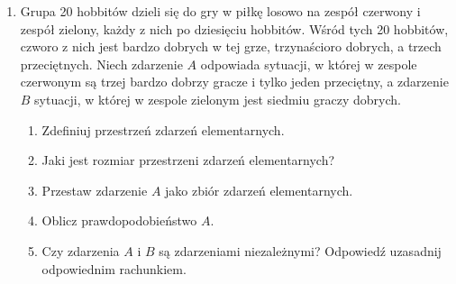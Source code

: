 \documentclass{mwart}
\begin{document}
\begin{enumerate}
\item Grupa 20 hobbitów dzieli się do gry w piłkę losowo na zespół czerwony i zespół zielony, każdy z nich po dziesięciu hobbitów.
Wśród tych 20 hobbitów, czworo z nich jest bardzo dobrych w tej grze, trzynaścioro dobrych, a trzech przeciętnych.
Niech zdarzenie $A$ odpowiada sytuacji, w której w zespole czerwonym są trzej bardzo dobrzy gracze i tylko jeden przeciętny, a zdarzenie $B$ sytuacji, w której w zespole zielonym jest siedmiu graczy dobrych.
\begin{enumerate}
\item Zdefiniuj przestrzeń zdarzeń elementarnych.
\item Jaki jest rozmiar przestrzeni zdarzeń elementarnych?
\item Przestaw zdarzenie $A$ jako zbiór zdarzeń elementarnych.
\item Oblicz prawdopodobieństwo $A$.
\item Czy zdarzenia $A$ i $B$ są zdarzeniami niezależnymi? Odpowiedź uzasadnij odpowiednim rachunkiem.
\end{enumerate}
\end{enumerate}

\clearpage
\end{document}
